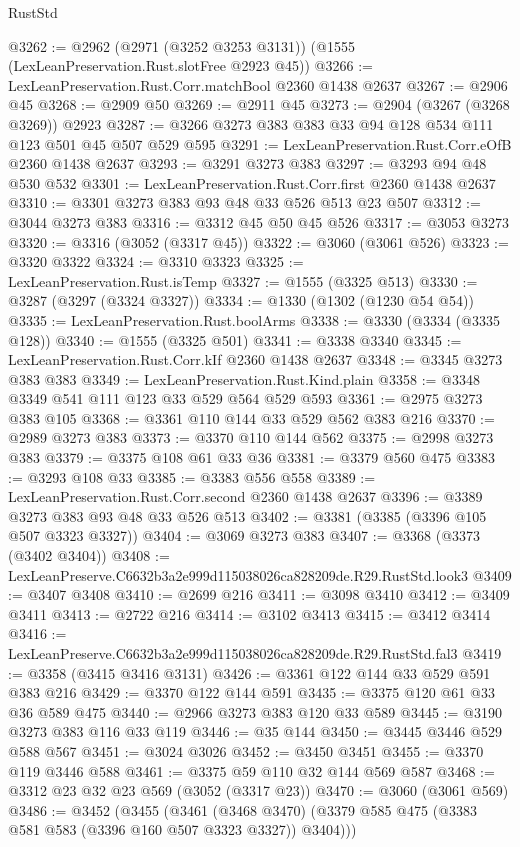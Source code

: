 \begin{lexlean}{RustStd}
\begin{coremodule}
@3262 := @2962 (@2971 (@3252 @3253 @3131)) (@1555 (LexLeanPreservation.Rust.slotFree @2923 @45))
@3266 := LexLeanPreservation.Rust.Corr.matchBool @2360 @1438 @2637
@3267 := @2906 @45
@3268 := @2909 @50
@3269 := @2911 @45
@3273 := @2904 (@3267 (@3268 @3269)) @2923
@3287 := @3266 @3273 @383 @383 @33 @94 @128 @534 @111 @123 @501 @45 @507 @529 @595
@3291 := LexLeanPreservation.Rust.Corr.eOfB @2360 @1438 @2637
@3293 := @3291 @3273 @383
@3297 := @3293 @94 @48 @530 @532
@3301 := LexLeanPreservation.Rust.Corr.first @2360 @1438 @2637
@3310 := @3301 @3273 @383 @93 @48 @33 @526 @513 @23 @507
@3312 := @3044 @3273 @383
@3316 := @3312 @45 @50 @45 @526
@3317 := @3053 @3273
@3320 := @3316 (@3052 (@3317 @45))
@3322 := @3060 (@3061 @526)
@3323 := @3320 @3322
@3324 := @3310 @3323
@3325 := LexLeanPreservation.Rust.isTemp
@3327 := @1555 (@3325 @513)
@3330 := @3287 (@3297 (@3324 @3327))
@3334 := @1330 (@1302 (@1230 @54 @54))
@3335 := LexLeanPreservation.Rust.boolArms
@3338 := @3330 (@3334 (@3335 @128))
@3340 := @1555 (@3325 @501)
@3341 := @3338 @3340
@3345 := LexLeanPreservation.Rust.Corr.kIf @2360 @1438 @2637
@3348 := @3345 @3273 @383 @383
@3349 := LexLeanPreservation.Rust.Kind.plain
@3358 := @3348 @3349 @541 @111 @123 @33 @529 @564 @529 @593
@3361 := @2975 @3273 @383 @105
@3368 := @3361 @110 @144 @33 @529 @562 @383 @216
@3370 := @2989 @3273 @383
@3373 := @3370 @110 @144 @562
@3375 := @2998 @3273 @383
@3379 := @3375 @108 @61 @33 @36
@3381 := @3379 @560 @475
@3383 := @3293 @108 @33
@3385 := @3383 @556 @558
@3389 := LexLeanPreservation.Rust.Corr.second @2360 @1438 @2637
@3396 := @3389 @3273 @383 @93 @48 @33 @526 @513
@3402 := @3381 (@3385 (@3396 @105 @507 @3323 @3327))
@3404 := @3069 @3273 @383
@3407 := @3368 (@3373 (@3402 @3404))
@3408 := LexLeanPreserve.C6632b3a2e999d115038026ca828209de.R29.RustStd.look3
@3409 := @3407 @3408
@3410 := @2699 @216
@3411 := @3098 @3410
@3412 := @3409 @3411
@3413 := @2722 @216
@3414 := @3102 @3413
@3415 := @3412 @3414
@3416 := LexLeanPreserve.C6632b3a2e999d115038026ca828209de.R29.RustStd.fal3
@3419 := @3358 (@3415 @3416 @3131)
@3426 := @3361 @122 @144 @33 @529 @591 @383 @216
@3429 := @3370 @122 @144 @591
@3435 := @3375 @120 @61 @33 @36 @589 @475
@3440 := @2966 @3273 @383 @120 @33 @589
@3445 := @3190 @3273 @383 @116 @33 @119
@3446 := @35 @144
@3450 := @3445 @3446 @529 @588 @567
@3451 := @3024 @3026
@3452 := @3450 @3451
@3455 := @3370 @119 @3446 @588
@3461 := @3375 @59 @110 @32 @144 @569 @587
@3468 := @3312 @23 @32 @23 @569 (@3052 (@3317 @23))
@3470 := @3060 (@3061 @569)
@3486 := @3452
    (@3455
      (@3461 (@3468 @3470) (@3379 @585 @475 (@3383 @581 @583 (@3396 @160 @507 @3323 @3327)) @3404)))

\end{coremodule}
\end{lexlean}
